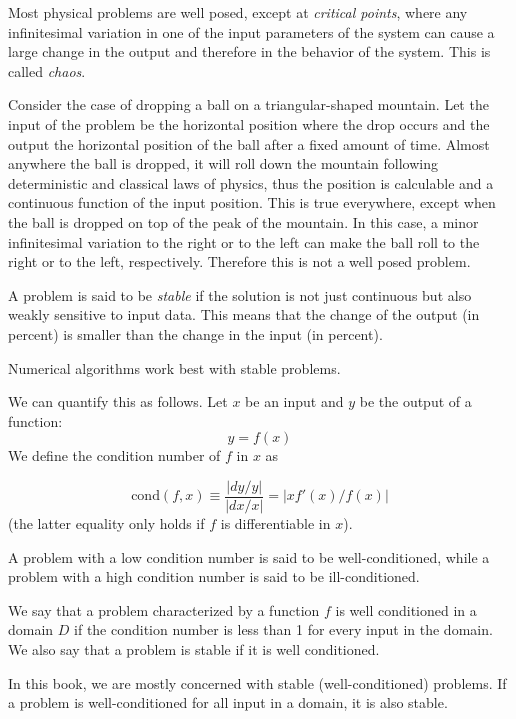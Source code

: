\documentclass[justified, sixbynine]{tufte-book}
\def\func{\textrm}
\theoremstyle{plain}%
\newtheorem * {corollary}{Corollary}
\theoremstyle{definition}
\theoremstyle{remark}
\newtheorem * {remark}{Remark}
\newtheorem * {note}{Note}
\begin{document}
\begin{fullwidth}

Most physical problems are well posed, except at {\it critical points}, where any infinitesimal variation in one of the input parameters of the system can cause a large change in the output and therefore in the behavior of the system. This is called {\it chaos}.

Consider the case of dropping a ball on a triangular-shaped mountain. Let the input of the problem be the horizontal position where the drop occurs and the output the horizontal position of the ball after a fixed amount of time. Almost anywhere the ball is dropped, it will roll down the mountain following deterministic and classical laws of physics, thus the position is calculable and a continuous function of the input position. This is true everywhere, except when the ball is dropped on top of the peak of the mountain. In this case, a minor infinitesimal variation to the right or to the left can make the ball roll to the right or to the left, respectively.  Therefore this is not a well posed problem.

A problem is said to be {\it stable} if the solution is not just continuous but also weakly sensitive to input data. This means that the change of the output (in percent) is smaller than the change in the input (in percent).

Numerical algorithms work best with stable problems.

We can quantify this as follows. Let $x$ be an input and $y$ be the output of a function:
\begin{equation}
y = f(x)
\end{equation}
We define the condition number of $f$ in $x$ as


\begin{equation}
\func{cond}(f, x) \equiv \frac{|dy/y|}{|dx/x|} = |x f'(x)/f(x)|
\end{equation}
(the latter equality only holds if $f$ is differentiable in $x$).

A problem with a low condition number is said to be well-conditioned, while a problem with a high condition number is said to be ill-conditioned.

We say that a problem characterized by a function $f$ is well conditioned in a domain $D$ if the condition number is less than 1 for every input in the domain. We also say that a problem is stable if it is well conditioned.

In this book, we are mostly concerned with stable (well-conditioned) problems. If a problem is well-conditioned for all input in a domain, it is also stable.


\end{fullwidth}
\end{document}
